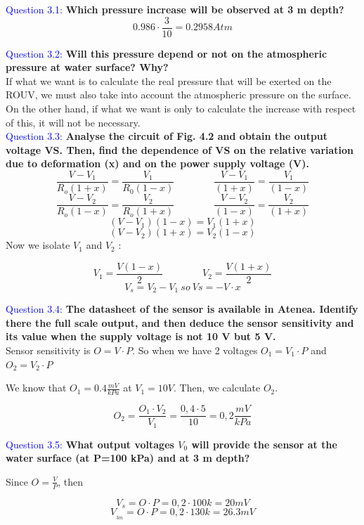 \documentclass[12pt, a4papre]{article}
\begin{document}
	\textcolor{blue}{Question 3.1:} \textbf{Which pressure increase will be observed at 3 m depth?}
	\[
		0.986\cdot\frac{3}{10} = 0.2958 Atm
	\]

	\textcolor{blue}{Question 3.2:} \textbf{Will this pressure depend or not on the atmospheric pressure at water surface? Why?}\\
	
		If what we want is to calculate the real pressure that will be exerted on the ROUV, we must also take into account the atmospheric pressure on the surface. On the other hand, if what we want is only to calculate the increase with respect of this, it will not be necessary.\\
	
	\textcolor{blue}{Question 3.3:} \textbf{Analyse the circuit of Fig. 4.2 and obtain the output voltage VS. Then, find the dependence of VS on the relative variation due to deformation (x) and on the power supply voltage (V). }
	\[
	\frac{V-V_{1}}{R_{o}( 1+x)} =\frac{V_{1}}{R_{0}( 1-x)} \qquad \qquad \frac{V-V_{1}}{( 1+x)} =\frac{V_{1}}{( 1-x)} 
	\]\[
	\frac{V-V_{2}}{R_{o}( 1-x)} =\frac{V_{2}}{R_{o}( 1+x)}\qquad \qquad \frac{V-V_{2}}{( 1-x)} =\frac{V_{2}}{( 1+x)} 
	\]\[
	( V-V_{1})( 1-x) =V_{1}( 1+x)
	\]\[
	( V-V_{2})( 1+x) =V_{2}( 1-x)
	\]
	Now we isolate $V_{1}$ and $V_{2}$ :
	
	\[
	V_{1} =\frac{V( 1-x)}{2}
	\qquad \qquad
	V_{2} =\frac{V( 1+x)}{2}
	\]\[
	V_{s} =V_{2} -V_{1} \ so\ Vs=-V\cdotp x
	\]
	
	\textcolor{blue}{Question 3.4:} \textbf{The datasheet of the sensor is available in Atenea. Identify there the full scale output, and then deduce the sensor sensitivity and its value when the supply voltage is not 10 V but 5 V.}\\
	
	Sensor sensitivity is $O=V\cdotp P$. So when we have 2 voltages $O_{1} =V_{1}\cdot P$ and $O_{2} =V_{2} \cdot P$

	We know that $O_1 = 0.4 \frac{mV}{kPa}$ at $V_1 = 10V$. Then, we calculate $O_2$.
	
	\[O_{2} =\frac{O_{1} \cdotp V_{2}}{V_{1}} =\frac{ 0,4\cdotp 5}{10} =0,2\frac{mV}{kPa}\]

	\textcolor{blue}{Question 3.5:} \textbf{What output voltages $V_0$ will provide the sensor at the water surface (at P=100 kPa) and at 3 m depth? }
	
	Since $O = \frac{V}{P}$, then
	
	\[V_{s} =O\cdotp P=0,2\cdotp 100k= 20mV\]
	\[V_{_{3m}} =O\cdotp P=0,2\cdotp 130k=26.3mV\]
	
\end{document}
